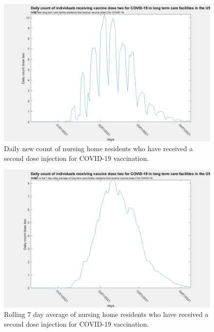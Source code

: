 \documentclass[twoside]{article}
\begin{document}
\begin{multicols}{2}
\begin{figure}[H]
	\includegraphics[width=\linewidth]{images/usa_daily_ltc_second_dose_unprocessed.png}
	\caption{Daily new count of nursing home residents who have received a second dose injection for COVID-19 vaccination.}
	\label{fig:images/usa_daily_ltc_second_dose_unprocessedLabel}
\end{figure}

\begin{figure}[H]
	\includegraphics[width=\linewidth]{images/usa_daily_ltc_second_dose_processed.png}
	\caption{Rolling 7 day average of nursing home residents who have received a second dose injection for COVID-19 vaccination.}
	\label{fig:images/usa_daily_ltc_second_dose_processedLabel}
\end{figure}


\end{multicols}
\end{document}
